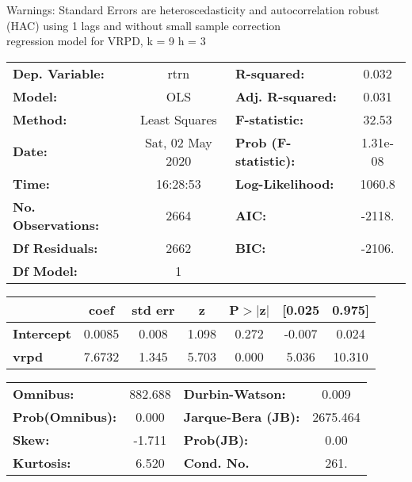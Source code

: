 Warnings: \newline
 [1] Standard Errors are heteroscedasticity and autocorrelation robust (HAC) using 1 lags and without small sample correction\\ 

regression model for VRPD, k = 9 h = 3\begin{center}
\begin{tabular}{lclc}
\toprule
\textbf{Dep. Variable:}    &       rtrn       & \textbf{  R-squared:         } &     0.032   \\
\textbf{Model:}            &       OLS        & \textbf{  Adj. R-squared:    } &     0.031   \\
\textbf{Method:}           &  Least Squares   & \textbf{  F-statistic:       } &     32.53   \\
\textbf{Date:}             & Sat, 02 May 2020 & \textbf{  Prob (F-statistic):} &  1.31e-08   \\
\textbf{Time:}             &     16:28:53     & \textbf{  Log-Likelihood:    } &    1060.8   \\
\textbf{No. Observations:} &        2664      & \textbf{  AIC:               } &    -2118.   \\
\textbf{Df Residuals:}     &        2662      & \textbf{  BIC:               } &    -2106.   \\
\textbf{Df Model:}         &           1      & \textbf{                     } &             \\
\bottomrule
\end{tabular}
\begin{tabular}{lcccccc}
                   & \textbf{coef} & \textbf{std err} & \textbf{z} & \textbf{P$> |$z$|$} & \textbf{[0.025} & \textbf{0.975]}  \\
\midrule
\textbf{Intercept} &       0.0085  &        0.008     &     1.098  &         0.272        &       -0.007    &        0.024     \\
\textbf{vrpd}      &       7.6732  &        1.345     &     5.703  &         0.000        &        5.036    &       10.310     \\
\bottomrule
\end{tabular}
\begin{tabular}{lclc}
\textbf{Omnibus:}       & 882.688 & \textbf{  Durbin-Watson:     } &    0.009  \\
\textbf{Prob(Omnibus):} &   0.000 & \textbf{  Jarque-Bera (JB):  } & 2675.464  \\
\textbf{Skew:}          &  -1.711 & \textbf{  Prob(JB):          } &     0.00  \\
\textbf{Kurtosis:}      &   6.520 & \textbf{  Cond. No.          } &     261.  \\
\bottomrule
\end{tabular}
\end{center}

